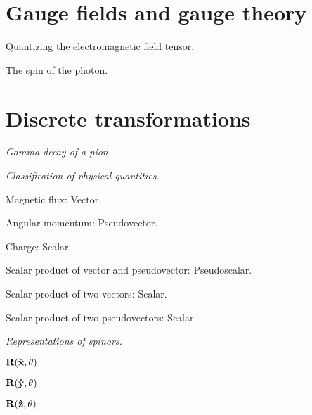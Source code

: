 \documentclass{report}
\begin{document}
\chapter{Gauge fields and gauge theory}

\begin{subquests}
	\item Quantizing the electromagnetic field tensor.

	\item The spin of the photon.
	\begin{subquests}
		\item

		\item
	\end{subquests}
\end{subquests}

\chapter{Discrete transformations}

\begin{subquests}
	\item \emph{Gamma decay of a pion.}

	\item \emph{Classification of physical quantities.}
	\begin{subquests}
		\item Magnetic flux: Vector.

		\item Angular momentum: Pseudovector.

		\item Charge: Scalar.

		\item Scalar product of vector and pseudovector: Pseudoscalar.

		\item Scalar product of two vectors: Scalar.

		\item Scalar product of two pseudovectors: Scalar.
	\end{subquests}

	\item \emph{Representations of spinors.}
	\begin{subquests}
		\item $\mathbf R(\vb{\hat x}, \theta)$

		\item $\mathbf R(\vb{\hat y}, \theta)$

		\item $\mathbf R(\vb{\hat z}, \theta)$
	\end{subquests}
\end{subquests}
\end{document}
